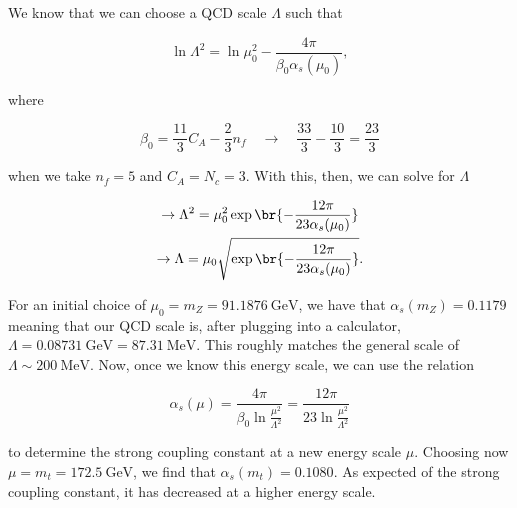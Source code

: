 \section{}

We know that we can choose a QCD scale $\Lambda$ such that

\begin{equation}
  \ln\Lambda^2 = \ln\mu_0^2 - \frac{4\pi}{\beta_0 \alpha_s(\mu_0)},
\end{equation}

where

\begin{equation}
  \beta_0 = \frac{11}{3}C_A - \frac{2}{3}n_f \quad\rightarrow\quad \frac{33}{3} - \frac{10}{3} = \frac{23}{3}
\end{equation}

when we take $n_f = 5$ and $C_A = N_c = 3$. With this, then, we can solve for $\Lambda$

\begin{gather}
  \rightarrow \Lambda^2 = \mu_0^2 \exp\br{-\frac{12\pi}{23 \alpha_s(\mu_0)}} \\
  \rightarrow \Lambda = \mu_0 \sqrt{\exp\br{-\frac{12\pi}{23 \alpha_s(\mu_0)}}}.
\end{gather}

For an initial choice of $\mu_0 = m_Z = \qty{91.1876}{\giga\electronvolt}$, we have that $\alpha_s(m_Z) = 0.1179$ meaning that our QCD scale is, after plugging into a calculator, $\boxed{\Lambda = \qty{0.08731}{\giga\electronvolt} = \qty{87.31}{\mega\electronvolt}.}$ This roughly matches the general scale of $\Lambda \sim \qty{200}{\mega\electronvolt}.$ Now, once we know this energy scale, we can use the relation

\begin{equation}
  \alpha_s(\mu) = \frac{4\pi}{\beta_0 \ln \frac{\mu^2}{\Lambda^2}} = \frac{12\pi}{23\ln \frac{\mu^2}{\Lambda^2}}
\end{equation}

to determine the strong coupling constant at a new energy scale $\mu$. Choosing now $\mu = m_t = \qty{172.5}{\giga\electronvolt}$, we find that $\boxed{\alpha_s(m_t) = 0.1080.}$ As expected of the strong coupling constant, it has decreased at a higher energy scale.


